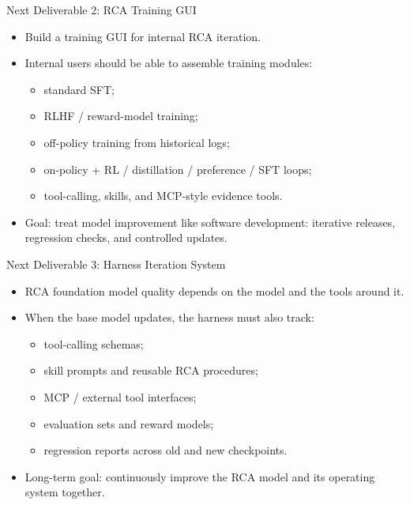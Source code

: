 \begin{frame}{Next Deliverable 2: RCA Training GUI}
  \begin{itemize}
    \item Build a training GUI for internal RCA iteration.
    \item Internal users should be able to assemble training modules:
      \begin{itemize}
        \item standard SFT;
        \item RLHF / reward-model training;
        \item off-policy training from historical logs;
        \item on-policy + RL / distillation / preference / SFT loops;
        \item tool-calling, skills, and MCP-style evidence tools.
      \end{itemize}
    \item Goal: treat model improvement like software development: iterative
      releases, regression checks, and controlled updates.
  \end{itemize}
\end{frame}

\begin{frame}{Next Deliverable 3: Harness Iteration System}
  \begin{itemize}
    \item RCA foundation model quality depends on the model and the tools around
      it.
    \item When the base model updates, the harness must also track:
      \begin{itemize}
        \item tool-calling schemas;
        \item skill prompts and reusable RCA procedures;
        \item MCP / external tool interfaces;
        \item evaluation sets and reward models;
        \item regression reports across old and new checkpoints.
      \end{itemize}
    \item Long-term goal: continuously improve the RCA model and its operating
      system together.
  \end{itemize}
\end{frame}

